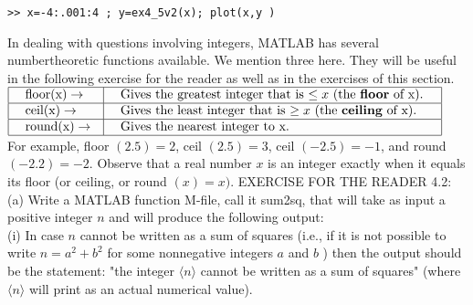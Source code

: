 \documentclass[../main.tex]{subfiles}
\begin{document}
\begin{verbatim}>> x=-4:.001:4 ; y=ex4_5v2(x); plot(x,y )\end{verbatim}

In dealing with questions involving integers, MATLAB has several numbertheoretic functions available. We mention three here. They will be useful in the
following exercise for the reader as well as in the exercises of this section. \\

$
\begin{array}{|l|l|}
\hline \begin{array}{l}
\text { floor(x)} \rightarrow
\end{array} & \begin{array}{l}
\text { Gives the greatest integer that is $\leq x$ (the \textbf{floor} of x). } \\
\end{array} \\
\hline \begin{array}{l}
\text { ceil(x)} \rightarrow
\end{array} & \begin{array}{l}
\text { Gives the least integer that is $\geq x$ (the \textbf{ceiling} of x). } \\
\end{array} \\
\hline \begin{array}{l}
\text { round(x)} \rightarrow
\end{array} & \begin{array}{l}
\text { Gives the nearest integer to x.  } \\
\end{array} \\
\hline
\end{array}
$ \\

For example, floor $(2.5)=2$, ceil $(2.5)=3$, ceil $(-2.5)=-1$, and round $(-2.2)=-2$. Observe that a real number $x$ is an integer exactly when it equals its floor (or ceiling, or round $(x)=x)$. EXERCISE FOR THE READER 4.2: (a) Write a MATLAB function M-file, call it sum2sq, that will take as input a positive integer $n$ and will produce the following output:\\

(i) In case $n$ cannot be written as a sum of squares (i.e., if it is not possible to write $n=a^{2}+b^{2}$ for some nonnegative integers $a$ and $b$ ) then the output should be the statement: "the integer $\langle n\rangle$ cannot be written as a sum of squares" (where $\langle n\rangle$ will print as an actual numerical value).
\end{document}
